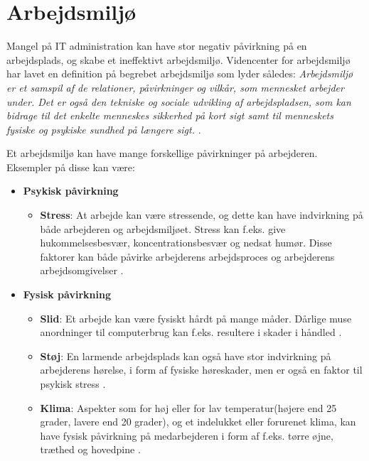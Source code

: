 \section{Arbejdsmiljø}
\noindent Mangel på IT administration kan have stor negativ påvirkning på en arbejdsplads, og skabe et ineffektivt arbejdsmiljø. Videncenter for arbejdsmiljø har lavet en definition på begrebet arbejdsmiljø som lyder således: \textit{Arbejdsmiljø er et samspil af de relationer, påvirkninger og vilkår, som mennesket arbejder under. Det er også den tekniske og sociale udvikling af arbejdspladsen, som kan bidrage til det enkelte menneskes sikkerhed på kort sigt samt til menneskets fysiske og psykiske sundhed på længere sigt.} \citep{Arbejdsmiljoe}.

Et arbejdsmiljø kan have mange forskellige påvirkninger på arbejderen. Eksempler på disse kan være: 
\begin{itemize}
    \item {\textbf{Psykisk påvirkning} \citep{Arbejdsmiljoe_psykisk}}
    \begin{itemize}
    \item {\textbf{Stress}: At arbejde  kan være stressende, og dette kan have indvirkning på både arbejderen og arbejdsmiljøet. Stress kan f.eks. give hukommelsesbesvær, koncentrationsbesvær og nedsat humør. Disse faktorer kan både påvirke arbejderens arbejdsproces og arbejderens arbejdsomgivelser \citep{Arbejdsmiljoe_stress}.}
    \end{itemize}
    \item {\textbf{Fysisk påvirkning} \citep{Arbejdsmiljoe_fysisk}}
    \begin{itemize}
    \item {\textbf{Slid}: Et arbejde kan være fysiskt hårdt på mange måder. Dårlige muse anordninger til computerbrug kan f.eks. resultere i skader i håndled \citep{Arbejdsmiljoe_fysisk}.}
    \item {\textbf{Støj}: En larmende arbejdsplads kan også have stor indvirkning på arbejderens hørelse, i form af fysiske høreskader, men er også en faktor til psykisk stress \citep{Arbejdsmiljoe_stoej}.}
    \item {\textbf{Klima}: Aspekter som for høj eller for lav temperatur(højere end 25 grader, lavere end 20 grader), og et indelukket eller forurenet klima, kan have fysisk påvirkning på medarbejderen i form af f.eks. tørre øjne, træthed og hovedpine \citep{Arbejdsmiljoe_indeklima}.}\\
    \end{itemize}
\end{itemize}

